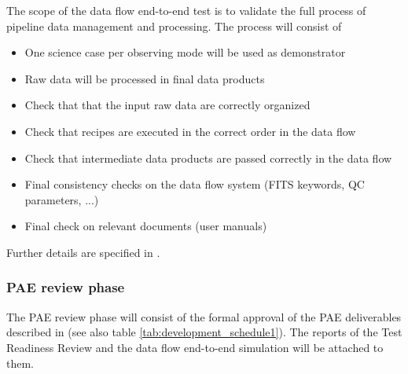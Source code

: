 The scope of the data flow end-to-end test is to validate the full process of pipeline data management and processing. The process will consist of
\begin{itemize}
    \item One science case per observing mode will be used as demonstrator
    \item Raw data will be processed in final data products
    \item Check that that the input raw data are correctly organized
    \item Check that recipes are executed in the correct order in the data flow
    \item Check that intermediate data products are passed correctly in the data flow
    \item Final consistency checks on the data flow system (FITS keywords, QC parameters, ...)
    \item Final check on relevant documents (user manuals)
\end{itemize}
Further details are specified in \cite{DRLVT}.

\subsubsection{PAE review phase}
\label{sssec:paw_review}

The PAE review phase will consist of the formal approval of the PAE deliverables described in \cite{1618} (see also table \ref{tab:development_schedule1}). The reports of the Test Readiness Review and the data flow end-to-end simulation will be attached to them. 

